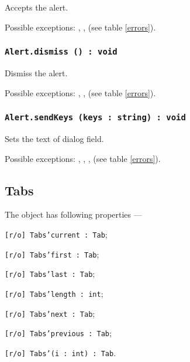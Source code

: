 Accepts the alert.

Possible exceptions: , ,  (see table \ref{errors}).

\subsubsection{\texttt{Alert.dismiss () : void}}

Dismiss the alert.

Possible exceptions: , ,  (see table \ref{errors}).

\subsubsection{\texttt{Alert.sendKeys (keys : string) : void}}

Sets the text of dialog field.

Possible exceptions: , , ,  (see table \ref{errors}).

\subsection{Tabs}

The object \tabs{} has following properties —
\begin{icItems}
	\item \texttt{[r/o] Tabs'current : Tab};
	\item \texttt{[r/o] Tabs'first : Tab};
	\item \texttt{[r/o] Tabs'last : Tab};
	\item \texttt{[r/o] Tabs'length : int};
	\item \texttt{[r/o] Tabs'next : Tab};
	\item \texttt{[r/o] Tabs'previous : Tab};
	\item \texttt{[r/o] Tabs'(i : int) : Tab}.
\end{icItems}

